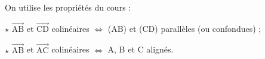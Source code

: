 \documentclass[border=4pt]{standalone}
\newcommand{\V}[1]{\overrightarrow{\mathrm{#1}}}
\begin{document}
\begin{minipage}{8.5cm}\large \colorbox{orange!8}{\begin{minipage}{8.2cm}\par On utilise les propriétés du cours :\par $\star$ $\V{AB}$ et $\V{CD}$ colinéaires $\Leftrightarrow$ (AB) et (CD) parallèles (ou confondues) ;\par $\star$ $\V{AB}$ et $\V{AC}$ colinéaires $\Leftrightarrow$ A, B et C alignés.\vspace{4pt}\end{minipage}}\end{minipage}
\end{document}
